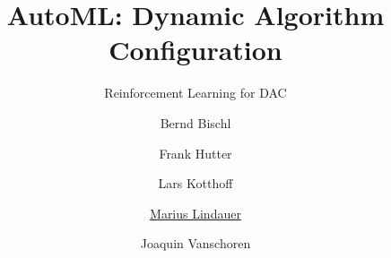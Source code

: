 




\title[AutoML: PBT]{AutoML: Dynamic Algorithm Configuration}
\subtitle{Reinforcement Learning for DAC}
\author[Marius Lindauer]{Bernd Bischl \and Frank Hutter \and Lars Kotthoff\newline \and \underline{Marius Lindauer} \and Joaquin Vanschoren}
\institute{}
\date{}





	
	\maketitle
	

